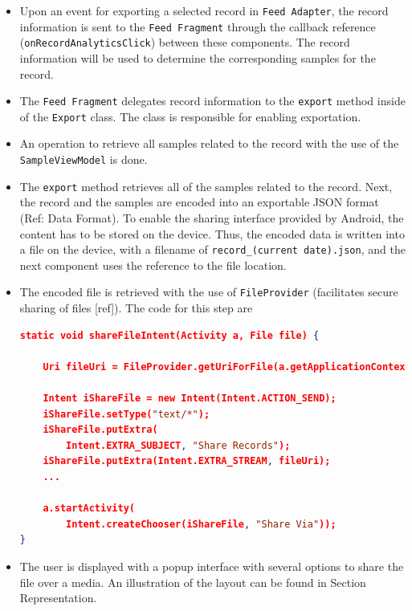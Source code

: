 \begin{itemize}
    \item[A.1] Upon an event for exporting a selected record in \verb|Feed Adapter|, the record information is sent to the \verb|Feed Fragment| through the callback reference (\verb|onRecordAnalyticsClick|) between these components. The record information will be used to determine the corresponding samples for the record.
    \item[A.2] The \verb|Feed Fragment| delegates record information to the \verb|export| method inside of the \verb|Export| class. The class is responsible for enabling exportation. 
    \item[A.3] An operation to retrieve all samples related to the record with the use of the \verb|SampleViewModel| is done. 
    \item[A.4] The \verb|export| method retrieves all of the samples related to the record. Next, the record and the samples are encoded into an exportable JSON format (Ref: Data Format). To enable the sharing interface provided by Android, the content has to be stored on the device. Thus, the encoded data is written into a file on the device, with a filename of \verb|record_(current date).json|, and the next component uses the reference to the file location. 
    \item[A.5] The encoded file is retrieved with the use of \verb|FileProvider| (facilitates secure sharing of files [ref]). The code for this step are
\begin{lstlisting}[language=json, caption={My Caption}, captionpos=b]
static void shareFileIntent(Activity a, File file) {

    Uri fileUri = FileProvider.getUriForFile(a.getApplicationContext(), a.getApplicationContext().getPackageName() + ".provider", file);

    Intent iShareFile = new Intent(Intent.ACTION_SEND);
    iShareFile.setType("text/*");
    iShareFile.putExtra(
        Intent.EXTRA_SUBJECT, "Share Records");
    iShareFile.putExtra(Intent.EXTRA_STREAM, fileUri);
    ...

    a.startActivity(
        Intent.createChooser(iShareFile, "Share Via"));
}

\end{lstlisting}

    \item[A.6] The user is displayed with a popup interface with several options to share the file over a media. An illustration of the layout can be found in Section Representation. 


\end{itemize}


